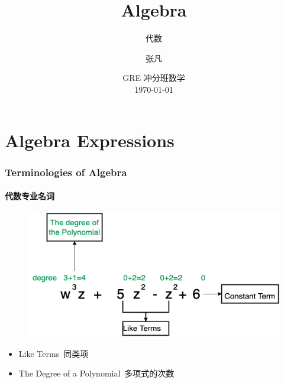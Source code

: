 \documentclass[
	11pt, %
]{beamer}
\title[Algebra]{Algebra} %
\subtitle{代数} %
\author[张凡]{张凡} %
\institute[XDF]{新东方国际教育 \\ \smallskip \textit{zhangfan@xdf.cn}} %
\date[\today]{GRE 冲分班数学 \\ \today} %
\begin{document}

\begin{frame}
	\titlepage %
\end{frame}






\section{Algebra Expressions}


\begin{frame}
	\frametitle{Terminologies of Algebra}
	\framesubtitle{代数专业名词}
	
			\begin{figure}
				\includegraphics[width=0.8\linewidth]{Polynomial.png}
			\end{figure}
			\begin{itemize}
				\item Like Terms\ 同类项
				\item The Degree of a Polynomial\ 多项式的次数
			\end{itemize}
\end{frame}

\end{document}
